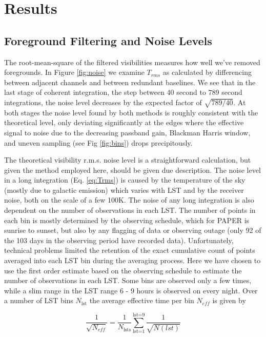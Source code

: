 \documentclass[preprint]{aastex}
\begin{document}
\section{Results}
\label{sec:results}
\subsection{Foreground Filtering and Noise Levels}
\label{sec:noise}
The root-mean-square of the filtered visibilities measures how well we've removed foregrounds.  In Figure \ref{fig:noise} we examine $T_{rms}$ as calculated by differencing between adjacent channels and between redundant baselines. We see that in the last stage of coherent integration, the step between 40 second to 789 second integrations, the noise level decreases by the expected factor of $\sqrt{789/40}$.  At both stages the noise level found by both methods is roughly consistent with the theoretical level, only deviating significantly at the edges where the effective signal to noise due to the decreasing passband gain, Blackman Harris window, and uneven sampling (see Fig \ref{fig:bins}) drops precipitously. 

The theoretical visibility r.m.s. noise level is a straightforward calculation, but given the method employed here, should be given due description.
The noise level in a long integration (Eq. \ref{eq:Trms}) is caused by the temperature of the sky (mostly due to galactic emission) which varies with LST and by the receiver noise, both on the scale of a few 100K. The noise of any long integration is also dependent on the number of observations in each LST.  The number of points in each bin is mostly determined by the observing schedule, which for PAPER is sunrise to sunset, but also by any flagging of data or observing outage (only 92 of the 103 days in the observing period have recorded data).  Unfortunately, technical problems limited the retention of the exact cumulative count of points averaged into each LST bin during the averaging process.  Here we have chosen to use the first order estimate based on the observing schedule to estimate the number of observations in each LST. Some bins are observed only a few times, while a slim range in the LST range 6 - 9 hours is observed on every night.  Over a number of LST bins $N_\textrm{lst}$ the average effective time per bin $N_{eff}$ is given by 

\[
\frac{1}{\sqrt{N_{eff}}} = \frac{1}{N_{\textrm{lsts}}} \sum_\textrm{lst=1}^\textrm{lst=9}{\frac{1}{\sqrt{N(lst)}}}
\]
\end{document}
